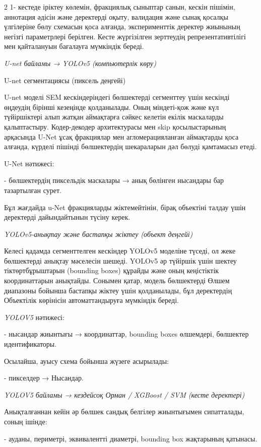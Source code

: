 \begin{multicols}{2}
1- кестеде іріктеу көлемін, фракциялық сыныптар санын, кескін пішімін,
аннотация әдісін және деректерді оқыту, валидация және сынақ қосалқы
үлгілеріне бөлу схемасын қоса алғанда, эксперименттік деректер жиынының
негізгі параметрлері берілген. Кесте жүргізілген зерттеудің
репрезентативтілігі мен қайталануын бағалауға мүмкіндік береді.

\emph{U-net байламы → YOLOv5 (компьютерлік көру)}

U-net сегментациясы (пиксель деңгейі)

U-net моделі SEM кескіндеріндегі бөлшектерді сегменттеу үшін кескінді
өңдеудің бірінші кезеңінде қолданылады. Оның міндеті-қож және күл
түйіршіктері алып жатқан аймақтарға сәйкес келетін екілік маскаларды
қалыптастыру. Кодер-декодер архитектурасы мен skip қосылыстарының
арқасында U-Net ұсақ фракциялар мен агломерацияланған аймақтарды қоса
алғанда, күрделі пішінді бөлшектердің шекараларын дәл бөлуді қамтамасыз
етеді.

U-Net нәтижесі:

- бөлшектердің пиксельдік маскалары → анық бөлінген нысандары бар
тазартылған сурет.

Бұл жағдайда u-Net фракцияларды жіктемейтінін, бірақ объектіні талдау
үшін деректерді дайындайтынын түсіну керек.

\emph{YOLOv5-анықтау және бастапқы жіктеу (объект деңгейі)}

Келесі қадамда сегменттелген кескіндер YOLOv5 моделіне түседі, ол жеке
бөлшектерді анықтау мәселесін шешеді. YOLOv5 әр түйіршік үшін шектеу
тіктөртбұрыштарын (bounding boxes) құрайды және оның кеңістіктік
координаттарын анықтайды. Сонымен қатар, модель бөлшектерді Өлшем
диапазоны бойынша бастапқы жіктеу үшін қолданылады, бұл деректердің
Объектілік көрінісін автоматтандыруға мүмкіндік береді.

\emph{YOLOV5} нәтижесі:

- нысандар жиынтығы → координаттар, bounding boxes өлшемдері, бөлшектер
идентификаторы.

Осылайша, ауысу схема бойынша жүзеге асырылады:

- пикселдер → Нысандар.

\emph{YOLOV5 байламы → кездейсоқ Орман / XGBoost / SVM (кесте
деректері)}

Анықталғаннан кейін әр бөлшек сандық белгілер жиынтығымен сипатталады,
соның ішінде:

- ауданы, периметрі, эквивалентті диаметрі, bounding box жақтарының
қатынасы.


\end{multicols}
